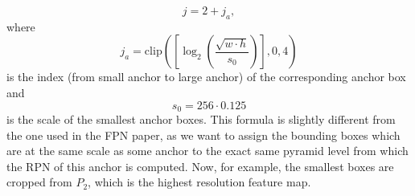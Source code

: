 \begin{equation}
j = 2 + j_a,
\end{equation}
where
\begin{equation}
j_a = \mathrm{clip}\left(\left[\log_2\left(\frac{\sqrt{w \cdot h}}{s_0}\right)\right], 0, 4\right)
\label{eq:level_assignment}
\end{equation}
is the index (from small anchor to large anchor) of the corresponding anchor box and
\begin{equation}
s_0 = 256 \cdot 0.125
\label{eq:level_assignment}
\end{equation}
is the scale of the smallest anchor boxes.
This formula is slightly different from the one used in the FPN paper,
as we want to assign the bounding boxes which are at the same scale
as some anchor to the exact same pyramid level from which the RPN of this
anchor is computed. Now, for example, the smallest boxes are cropped from $P_2$,
which is the highest resolution feature map.


